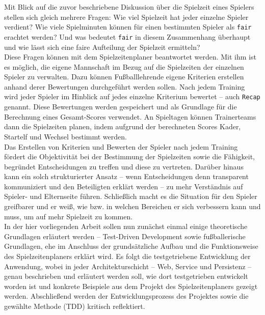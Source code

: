 Mit Blick auf die zuvor beschriebene Diskussion über die Spielzeit eines Spielers 
stellen sich gleich mehrere Fragen: Wie viel Spielzeit hat jeder einzelne Spieler 
verdient? Wie viele Spielminuten können für einen bestimmten Spieler als \texttt{fair} 
erachtet werden? Und was bedeutet \texttt{fair} in diesem Zusammenhang überhaupt und 
wie lässt sich eine faire Aufteilung der Spielzeit ermitteln? \\ 
Diese Fragen können mit dem Spielzeitenplaner beantwortet werden. Mit ihm ist es 
möglich, die eigene Mannschaft im Bezug auf die Spielzeiten der einzelnen Spieler zu 
verwalten. Dazu können Fußballlehrende eigene Kriterien erstellen anhand derer 
Bewertungen durchgeführt werden sollen. Nach jedem Training wird jeder Spieler im 
Hinblick auf jedes einzelne Kriterium bewertet -- auch \texttt{Recap} genannt. 
Diese Bewertungen werden gespeichert und als Grundlage für die Berechnung eines 
Gesamt-Scores verwendet. An Spieltagen können Trainerteams dann die Spielzeiten 
planen, indem aufgrund der berechneten Scores Kader, Startelf und Wechsel bestimmt 
werden. \\ 
Das Erstellen von Kriterien und Bewerten der Spieler nach jedem Training fördert die 
Objektivität bei der Bestimmung der Spielzeiten sowie die Fähigkeit, begründet 
Entscheidungen zu treffen und diese zu vertreten. Darüber hinaus kann ein solch 
strukturierter Ansatz -- wenn Entscheidungen denn transparent kommuniziert und den 
Beteiligten erklärt werden -- zu mehr Verständnis auf Spieler- und Elternseite 
führen. Schließlich macht es die Situation für den Spieler greifbarer und er weiß, 
wie bzw. in welchen Bereichen er sich verbessern kann und muss, um auf mehr Spielzeit 
zu kommen. \\ 
In der hier vorliegenden Arbeit sollen nun zunächst einmal einige theoretische 
Grundlagen erläutert werden -- Test-Driven Development sowie fußballerische 
Grundlagen, ehe im Anschluss der grundsätzliche Aufbau und die Funktionsweise des 
Spielzeitenplaners erklärt wird. Es folgt die testgetriebene Entwicklung der Anwendung, 
wobei in jeder Architekturschicht -- Web, Service und Persistenz -- genau beschrieben 
und erläutert werden soll, wie dort testgetrieben entwickelt worden ist und konkrete 
Beispiele aus dem Projekt des Spielzeitenplaners gezeigt werden. Abschließend werden der 
Entwicklungsprozess des Projektes sowie die gewählte Methode (TDD) kritisch reflektiert. 

